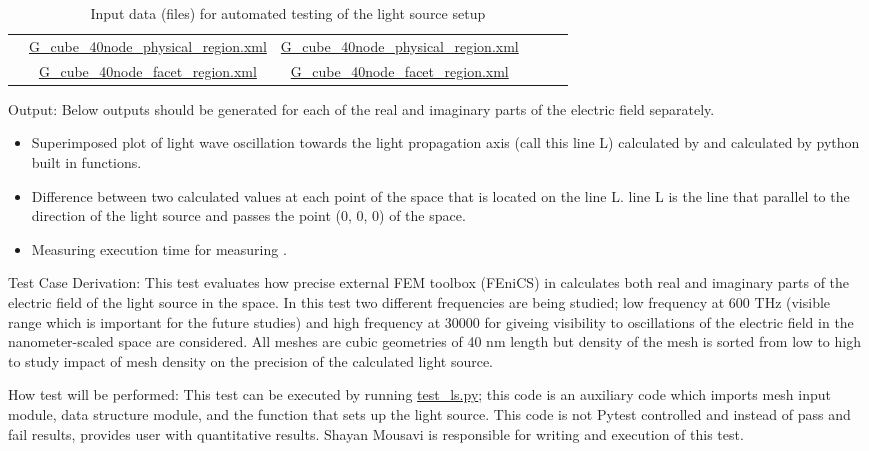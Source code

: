\documentclass[12pt, titlepage]{article}
\begin{document}
\begin{enumerate}
\begin{table}[h!]
\begin{tabular}{|c|c|c|c|c|c|}
			& \href{https://github.com/shmouses/SPDFM/tree/master/src/G_cube_40node_physical_region.xml}{G\_cube\_40node\_physical\_region.xml} &
			\href{https://github.com/shmouses/SPDFM/tree/master/src/G_cube_40node_physical_region.xml}{G\_cube\_40node\_physical\_region.xml} \\
			
			& \href{https://github.com/shmouses/SPDFM/tree/master/src/G_cube_40node_facet_region.xml}{G\_cube\_40node\_facet\_region.xml} &
			\href{https://github.com/shmouses/SPDFM/tree/master/src/G_cube_40node_facet_region.xml}{G\_cube\_40node\_facet\_region.xml} \\
			\hline
		\end{tabular}
	\caption{Input data (files) for automated testing of the light source setup}
	\label{LS_t}
\end{table}
	
	Output: Below outputs should be generated for each of the real and imaginary parts of the electric field separately.
	
	\begin{itemize}
		\item Superimposed plot of light wave oscillation towards the light propagation axis (call this line L) calculated by \progname{} and calculated by python built in functions.  
		\item  Difference between two calculated values at each point of the space that is located on the line L. line L is the line that parallel to the direction of the light source and passes the point (0, 0, 0) of the space. 
		\item Measuring execution time for measuring .
	    
	\end{itemize}	

	Test Case Derivation: This test evaluates how precise external FEM toolbox (FEniCS) in \progname{} calculates both real and imaginary parts of the electric field of the light source in the space. In this test two different frequencies are being studied; low frequency at 600 THz (visible range which is important for the future studies) and high frequency at 30000 for giveing visibility to oscillations of the electric field in the nanometer-scaled space are considered. All meshes are cubic geometries of 40 nm length but density of the mesh is sorted from low to high to study impact of mesh density on the precision of the calculated light source. 
	
	How test will be performed: This test can be executed by running \href{https://github.com/shmouses/SPDFM/tree/master/src/test_ls.py}{test\_ls.py}; this code is an auxiliary code which imports \progname{} mesh input module, data structure module, and the function that sets up the light source. This code is not Pytest controlled and instead of pass and fail results, provides user with quantitative results. Shayan Mousavi is responsible for writing and execution of this test.   
	

\end{enumerate}
\end{document}
